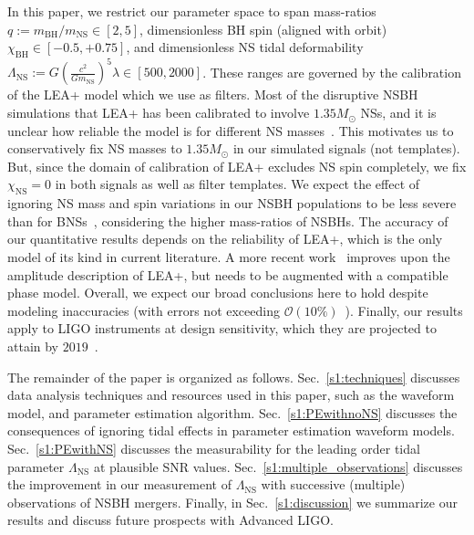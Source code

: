 \documentclass[aps,prd,amsmath,floats,floatfix, twocolumn,
superscriptaddress,nofootinbib,showpacs]{revtex4-1}
\newcommand{\lambdans}{\Lambda_\mathrm{NS}}
\newcommand{\chibh}{\chi_\mathrm{BH}}
\newcommand{\chins}{\chi_\mathrm{NS}}
\newcommand{\mbh}{m_\mathrm{BH}}
\newcommand{\mns}{m_\mathrm{NS}}
\begin{document}
In this paper, we restrict our parameter space to span mass-ratios
$q:=\mbh/\mns\in[2,5]$, dimensionless BH spin (aligned with orbit)
$\chibh\in[-0.5, +0.75]$, and dimensionless NS tidal deformability 
$\lambdans:= G\left(\frac{c^2}{G \mns}\right)^5\lambda \in[500, 2000]$.
These ranges are governed by the calibration of the LEA+ model which we use as
filters. 
% 
Most of the disruptive NSBH simulations that LEA+ has been calibrated to
involve $1.35M_\odot$ NSs, and it is unclear how reliable the model is 
for different NS masses~\cite{Lackey:2013axa,Pannarale:2015jka}. This
motivates us to conservatively fix NS masses to $1.35M_\odot$ in our 
simulated signals (not templates). But, since the domain of calibration of
LEA+ excludes NS spin completely, we fix $\chins=0$ in both signals as well as
filter templates. We expect the effect of ignoring NS mass and spin variations
in our NSBH populations to be less severe than for
BNSs~\cite{Agathos:2015a}, considering the higher mass-ratios of NSBHs.
% 
The accuracy of our quantitative results depends on the reliability of LEA+,
which is the only model of its kind in current literature. A more recent 
work~\cite{Pannarale:2015jka} improves upon the amplitude description of LEA+,
but needs to be augmented with a compatible phase model. Overall, we expect
our broad conclusions here to hold despite modeling inaccuracies (with errors
not exceeding $\mathcal{O}(10\%)$~\cite{Pannarale:2015jka}).
% 
Finally, our results apply to LIGO instruments at design sensitivity,
which they are projected to attain by $2019$~\cite{Shoemaker2009,
Abbott:2016wya}.


The remainder of the paper is organized as follows. 
Sec.~\ref{s1:techniques} discusses data analysis techniques and resources 
used in this paper, such as the waveform model, and parameter estimation 
algorithm.
Sec.~\ref{s1:PEwithnoNS} discusses the consequences of ignoring tidal 
effects in parameter estimation waveform models.
Sec.~\ref{s1:PEwithNS} discusses the measurability for the leading order
tidal parameter $\lambdans$ at plausible SNR values.
Sec.~\ref{s1:multiple_observations} discusses the improvement in our
measurement of $\lambdans$ with successive (multiple) observations of
NSBH mergers.
Finally, in Sec.~\ref{s1:discussion} we summarize our results and discuss
future prospects with Advanced LIGO.





\end{document}
